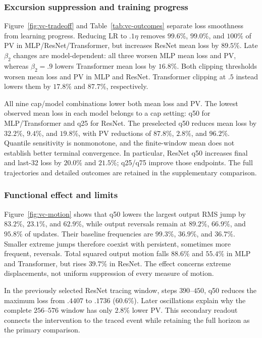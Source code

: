 \subsubsection{Excursion suppression and training progress}
Figure~\ref{fig:vc-tradeoff} and Table~\ref{tab:vc-outcomes} separate loss
smoothness from learning progress. Reducing LR to $.1\eta$ removes
$99.6\%$, $99.0\%$, and $100\%$ of PV in MLP/ResNet/Transformer, but increases
ResNet mean loss by $89.5\%$. Late $\beta_2$ changes are model-dependent:
all three worsen MLP mean loss and PV, whereas $\beta_2=.9$ lowers
Transformer mean loss by $16.8\%$. Both clipping thresholds worsen mean loss
and PV in MLP and ResNet. Transformer clipping at $.5$ instead lowers them
by $17.8\%$ and $87.7\%$, respectively.

All nine cap/model combinations lower both mean loss and PV. The lowest observed
mean loss in each model belongs to a cap setting: q50 for MLP/Transformer
and q25 for ResNet. The preselected q50 reduces mean loss by
$32.2\%$, $9.4\%$, and $19.8\%$, with PV reductions of $87.8\%$, $2.8\%$, and $96.2\%$.
Quantile sensitivity is nonmonotone, and the finite-window mean does not establish
better terminal convergence. In particular, ResNet q50 increases final and
last-32 loss by $20.0\%$ and $21.5\%$; q25/q75 improve those endpoints.
The full trajectories and detailed outcomes are retained in the supplementary
comparison.

\subsubsection{Functional effect and limits}
Figure~\ref{fig:vc-motion} shows that q50 lowers the largest output RMS jump
by $83.2\%$, $23.1\%$, and $62.9\%$, while output reversals remain at
$89.2\%$, $66.9\%$, and $95.8\%$ of updates. Their baseline frequencies are
$99.3\%$, $36.9\%$, and $36.7\%$. Smaller extreme jumps therefore coexist with
persistent, sometimes more frequent, reversals. Total squared output motion
falls $88.6\%$ and $55.4\%$ in MLP and Transformer, but rises $39.7\%$
in ResNet. The effect concerns extreme displacements, not uniform suppression
of every measure of motion.

In the previously selected ResNet tracing window, steps $390$--$450$, q50
reduces the maximum loss from $.4407$ to $.1736$ ($60.6\%$).
Later oscillations explain why the complete $256$--$576$ window has only
$2.8\%$ lower PV. This secondary readout connects the intervention to the
traced event while retaining the full horizon as the primary comparison.

